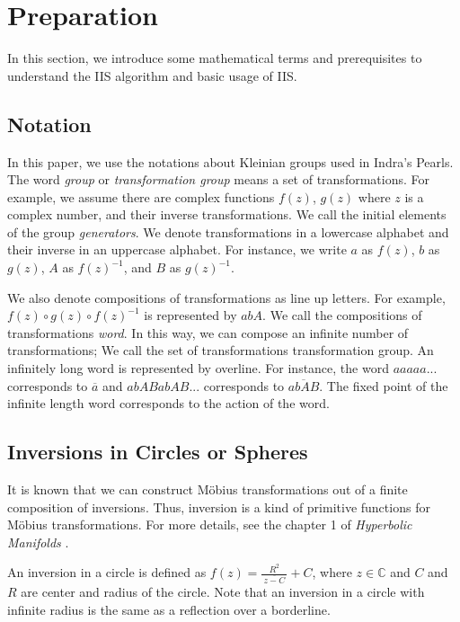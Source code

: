 
\section{Preparation}

In this section, we introduce some mathematical terms and prerequisites
to understand the IIS algorithm and basic usage of IIS.

\subsection{Notation}

In this paper, we use the notations about Kleinian groups used in
Indra's Pearls.
The word \textit{group} or \textit{transformation group} means a set of
transformations. 
For example, we assume there are complex functions $f(z)$, $g(z)$
where $z$ is a complex number, and their inverse transformations. %
We call the initial elements of the group \textit{generators}.
We denote transformations in a lowercase alphabet and 
their inverse in an uppercase alphabet.
For instance, we write $a$ as $f(z)$, $b$ as $g(z)$, $A$ as $f(z)^{-1}$,
and $B$ as $g(z)^{-1}$.

We also denote compositions of transformations as line up letters.
For example, $f(z) \circ g(z) \circ f(z)^{-1}$ is represented by $abA$.
We call the compositions of transformations \textit{word}.
In this way, we can compose an infinite number of transformations;
We call the set of transformations transformation group.
An infinitely long word is represented by overline.
For instance, the word $aaaaa...$ corresponds to $\overline{a}$ and
$abABabAB...$ corresponds to $\overline{abAB}$.
The fixed point of the infinite length word corresponds to the action of
the word.

\subsection{Inversions in Circles or Spheres}

It is known that we can construct M\"obius transformations out of a finite
composition of inversions. Thus, inversion is a kind of primitive
functions for M\"obius transformations.
For more details, see the chapter 1 of \textit{Hyperbolic Manifolds}
 \cite{marden_2016}.

An inversion in a circle is defined as $f(z) = \frac{R^2}{~\overline{z -C}~} + C$,
where $z \in \mathbb{C}$ and $C$ and $R$ are center and radius of the circle.
Note that an inversion in a circle with infinite radius is the same as
a reflection over a borderline.

